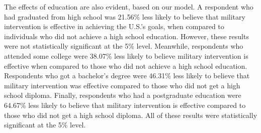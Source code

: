 \documentclass[
  11pt,
]{article}
\begin{document}
The effects of education are also evident, based on our model. A
respondent who had graduated from high school was 21.56\% less likely to
believe that military intervention is effective in achieving the U.S.'s
goals, when compared to individuals who did not achieve a high school
education. However, these results were not statistically significant at
the 5\% level. Meanwhile, respondents who attended some college were
38.07\% less likely to believe military intervention is effective when
compared to those who did not achieve a high school education.
Respondents who got a bachelor's degree were 46.31\% less likely to
believe that military intervention was effective compared to those who
did not get a high school diploma. Finally, respondents who had a
postgraduate education were 64.67\% less likely to believe that military
intervention is effective compared to those who did not get a high
school diploma. All of these results were statistically significant at
the 5\% level.
\end{document}
